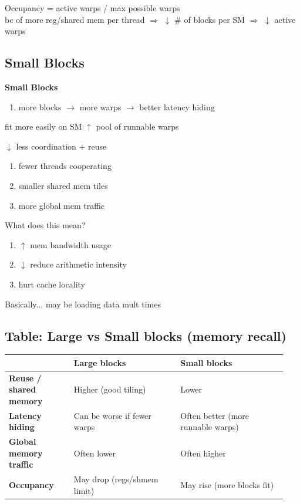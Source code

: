 \documentclass[11pt]{article}
\newcommand{\blue}[1]{\textcolor{myblue}{#1}}
\newcommand{\red}[1]{\textcolor{myred}{#1}}
\begin{document}
Occupancy = active warps / max possible warps\\
bc of more reg/shared mem per thread $\Rightarrow$ $\downarrow$ \# of blocks per SM $\Rightarrow$ $\downarrow$ active warps

\subsection*{\blue{Small Blocks}}
\textbf{Small Blocks}
\begin{enumerate}
\item more blocks $\rightarrow$ more warps $\rightarrow$ better latency hiding \checkmark
\end{enumerate}
\quad fit more easily on SM $\uparrow$ pool of runnable warps

\red{$\downarrow$ less coordination + reuse}
\begin{enumerate}
\item fewer threads cooperating
\item smaller shared mem tiles
\item more global mem traffic
\end{enumerate}

What does this mean?
\begin{enumerate}
\item $\uparrow$ mem bandwidth usage
\item $\downarrow$ reduce arithmetic intensity
\item hurt cache locality
\end{enumerate}
Basically... may be loading data mult times

\subsection*{\blue{Table: Large vs Small blocks (memory recall)}}
\begin{center}
\renewcommand{\arraystretch}{1.15}
\begin{tabular}{|>{\bfseries}p{0.22\linewidth}|p{0.36\linewidth}|p{0.36\linewidth}|}
\hline
 & Large blocks & Small blocks \\
\hline
Reuse / shared memory & \blue{Higher} (good tiling) & \red{Lower} \\
\hline
Latency hiding & \red{Can be worse} if fewer warps & \blue{Often better} (more runnable warps) \\
\hline
Global memory traffic & \blue{Often lower} & \red{Often higher} \\
\hline
Occupancy & \red{May drop} (regs/shmem limit) & \blue{May rise} (more blocks fit) \\
\hline
\end{tabular}
\end{center}
\end{document}
